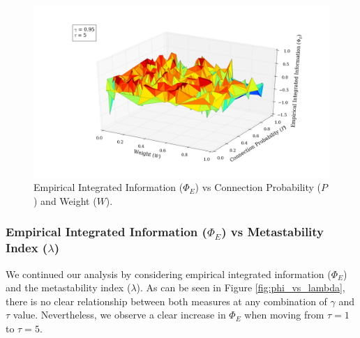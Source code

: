 \documentclass[a4paper,11pt]{article}
\begin{document}
\begin{figure}[H]
\begin{minipage}[b]{0.5\linewidth}
\begin{center}
		\end{center}
		\vspace{4ex}
	\end{minipage}
	\begin{minipage}[b]{0.5\linewidth}
		\begin{center}
		\includegraphics[scale = 0.2]{figures/snn/p_w_phi_95_5}
		\end{center}
		\vspace{4ex}
	\end{minipage}
	\caption{
		Empirical Integrated Information ($\Phi_E$) vs Connection Probability ($P$) and Weight ($W$).
		\label{fig:p_w_phi_all}
	}
\end{figure}

\subsubsection{Empirical Integrated Information ($\Phi_E$) vs Metastability Index ($\lambda$)}
\label{sec:app:snn:res:phi-lambda}
We continued our analysis by considering empirical integrated information ($\Phi_E$) and the metastability index ($\lambda$). As can be seen in Figure \ref{fig:phi_vs_lambda}, there is no clear relationship between both measures at any combination of $\gamma$ and $\tau$ value. Nevertheless, we observe a clear increase in $\Phi_E$ when moving from $\tau = 1$ to $\tau = 5$.
\end{document}
